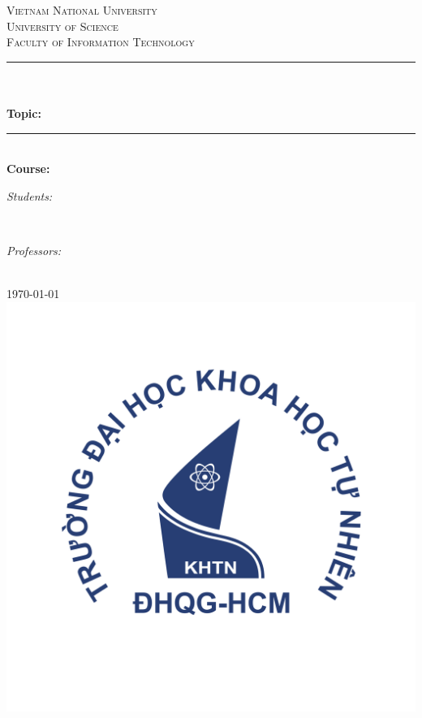 \begin{titlepage}
\newcommand{\HRule}{\rule{\linewidth}{0.5mm}}
\centering

\textsc{\LARGE Vietnam National University}\\[0.5cm]
\textsc{\Large University of Science}\\[0.5cm]
\textsc{\large Faculty of Information Technology}\\[0.5cm]

\HRule \\[0.4cm]
{ 
\huge{\bfseries{\reporttitle}}\\[0.5cm]
\large{\bfseries{Topic: \reportname}}
}\\[0.4cm]
\HRule \\[0.5cm]

\textbf{\large Course: \coursename}\\[0.5cm]

\begin{minipage}[t]{0.4\textwidth}
\begin{flushleft} \large
\emph{Students:}\\
\studentname
\end{flushleft}
\end{minipage}
~
\begin{minipage}[t]{0.5\textwidth}
\begin{flushright} \large
\emph{Professors:} \\
\teachername
\end{flushright}
\end{minipage}\\[1cm]

{\large \today}\\[1cm]

\includegraphics[scale=.20]{img/hcmus-logo.png}\\[1cm] 

\vfill
\end{titlepage}
	